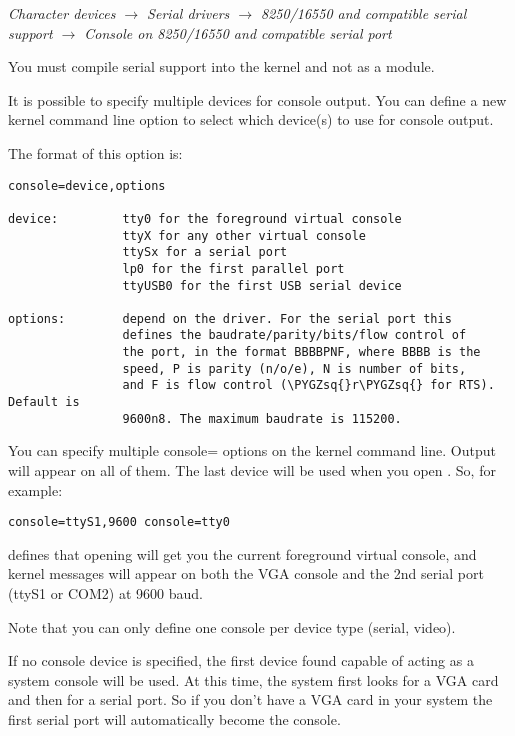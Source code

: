 \documentclass[a4paper,8pt,english]{sphinxmanual}
\def\PYGZsq{\char`\'}
\renewcommand\PYGZsq{\textquotesingle}
\begin{document}
\emph{Character devices \(\rightarrow\) Serial drivers \(\rightarrow\) 8250/16550 and compatible serial support \(\rightarrow\) Console on 8250/16550 and compatible serial port}

You must compile serial support into the kernel and not as a module.

It is possible to specify multiple devices for console output. You can
define a new kernel command line option to select which device(s) to
use for console output.

The format of this option is:

\begin{Verbatim}[commandchars=\\\{\}]
console=device,options

device:         tty0 for the foreground virtual console
                ttyX for any other virtual console
                ttySx for a serial port
                lp0 for the first parallel port
                ttyUSB0 for the first USB serial device

options:        depend on the driver. For the serial port this
                defines the baudrate/parity/bits/flow control of
                the port, in the format BBBBPNF, where BBBB is the
                speed, P is parity (n/o/e), N is number of bits,
                and F is flow control (\PYGZsq{}r\PYGZsq{} for RTS). Default is
                9600n8. The maximum baudrate is 115200.
\end{Verbatim}

You can specify multiple console= options on the kernel command line.
Output will appear on all of them. The last device will be used when
you open . So, for example:

\begin{Verbatim}[commandchars=\\\{\}]
console=ttyS1,9600 console=tty0
\end{Verbatim}

defines that opening  will get you the current foreground
virtual console, and kernel messages will appear on both the VGA
console and the 2nd serial port (ttyS1 or COM2) at 9600 baud.

Note that you can only define one console per device type (serial, video).

If no console device is specified, the first device found capable of
acting as a system console will be used. At this time, the system
first looks for a VGA card and then for a serial port. So if you don't
have a VGA card in your system the first serial port will automatically
become the console.
\end{document}
